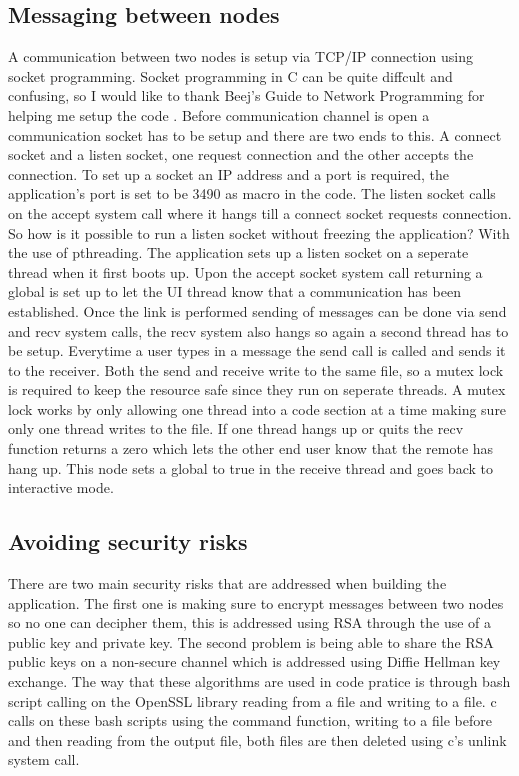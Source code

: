 \documentclass[twoside]{article}
\begin{document}
\begin{multicols}{2}
\subsection{Messaging between nodes }
A communication between two nodes is setup via TCP/IP connection using socket programming. Socket programming in C can be quite diffcult and confusing, so I would like to thank Beej's Guide to Network Programming for helping me setup the code \cite{hall}. Before communication channel is open a communication socket has to be setup and there are two ends to this. A connect socket and a listen socket, one request connection and the other accepts the connection. To set up a socket an IP address and a port is required, the application's port is set to be 3490 as macro in the code. The listen socket calls on the accept system call where it hangs till a connect socket requests connection. So how is it possible to run a listen socket without freezing the application? With the use of pthreading. The application sets up a listen socket on a seperate thread when it first boots up. Upon the accept socket system call returning a global is set up to let the UI thread know that a communication has been established. Once the link is performed sending of messages can be done via send and recv system calls, the recv system also hangs so again a second thread has to be setup. Everytime a user types in a message the send call is called and sends it to the receiver. Both the send and receive write to the same file, so a mutex lock is required to keep the resource safe since they run on seperate threads. A mutex lock works by only allowing one thread into a code section at a time making sure only one thread writes to the file. If one thread hangs up or quits the recv function returns a zero which lets the other end user know that the remote has hang up. This node sets a global to true in the receive thread and goes back to interactive mode. 
\subsection{Avoiding security risks}
There are two main security risks that are addressed when building the application. The first one is making sure to encrypt messages between two nodes so no one can decipher them, this is addressed using RSA through the use of a public key and private key. The second problem is being able to share the RSA public keys on a non-secure channel which is addressed using Diffie Hellman key exchange. The way that these algorithms are used in code pratice is through bash script calling on the OpenSSL library reading from a file and writing to a file. c calls on these bash scripts using the command function, writing to a file before and then reading from the output file, both files are then deleted using c's unlink system call. 

\end{multicols}
\end{document}
